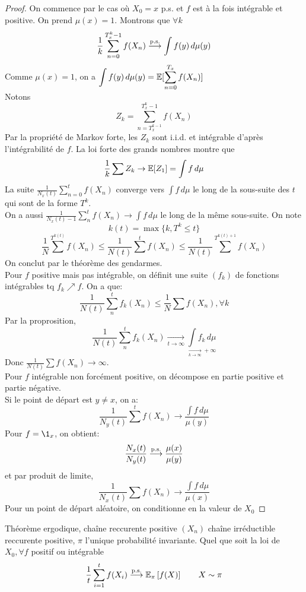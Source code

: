 \documentclass[]{report}
\begin{document}
    \begin{proof}
        On commence par le cas où $X_0=x$ p.s. et $f$ est à la fois intégrable et positive. On prend $\mu(x)=1$. Montrons que $\forall k$
        \[\frac{1}{k}\sum_{n=0}^{T_x^k-1}f(X_n)\overset{\text{p.s.}}{\longrightarrow}\int f(y)\, d\mu(y)\]
        Comme $\mu(x)=1$, on a $\displaystyle{\int f(y)\, d\mu(y)=\mathbb{E}[\sum^{T_x}_{n=0}f(X_n)]}$\\
        Notons \begin{displaymath}
            Z_k=\sum_{n=T_x^{k-1}}^{T_x^{k}-1}f(X_n)
        \end{displaymath}
        Par la propriété de Markov forte, les $Z_k$ sont i.i.d. et intégrable d'après l'intégrabilité de $f$. La loi forte des grands nombres montre que
        \[\frac{1}{k}\sum Z_k\to \mathbb{E}[Z_1]=\int f\, d\mu\]
        La suite $\frac{1}{N_x(t)}\sum_{n=0}^{t}f(X_n)$ converge vers $\int f\, d\mu$ le long de la sous-suite des $t$ qui sont de la forme $T^k$.\\
        On a aussi $\frac{1}{N_x(t)-1}\sum_{n}^{t}f(X_n)\to \int f\, d\mu$ le long de la même sous-suite. On note
        \[k(t)=\max\{k,T^k\le t\}\]
        \[\frac{1}{N}\sum^{T^{k(t)}}f(X_n)\le \frac{1}{N(t)}\sum^t f(X_n)\le \frac{1}{N(t)}\sum^{T^{k(t)+1}}f(X_n)\]
        On conclut par le théorème des gendarmes.\\
        Pour $f$ positive mais pas intégrable, on définit une suite $(f_k)$ de fonctions intégrables tq $f_k\nearrow f$. On a que:
        \[\frac{1}{N(t)}\sum_{n}^{t}f_k(X_n)\le \frac{1}{N}\sum f(X_n),\forall k\]
        Par la proprosition,
        \[\frac{1}{N(t)}\sum_{n}^{t}f_k(X_n)\underset{t\to \infty}{\longrightarrow}\underset{\underset{k\to \infty}{\longrightarrow}+\infty}{\int f_k \,d\mu}\]
        Donc $\frac{1}{N(t)}\sum f(X_n)\to \infty$.\\
        Pour $f$ intégrable non forcément positive, on décompose en partie positive et partie négative.\\
        Si le point de départ est $y\neq x$, on a:
        \[\frac{1}{N_y(t)}\sum^t f(X_n)\to \dfrac{\int f\, d\mu}{\mu(y)}\]
        Pour $f=\1_{x}$, on obtient:
        \[\dfrac{N_x(t)}{N_y(t)}\overset{\text{p.s.}}{\longrightarrow} \dfrac{\mu(x)}{\mu(y)}\]
        et par produit de limite,
        \[\dfrac{1}{N_x(t)}\sum f(X_n)\to \dfrac{\int f\, d\mu}{\mu(x)}\]
        Pour un point de départ aléatoire, on conditionne en la valeur de $X_0$
    \end{proof}

    \begin{cor}{Théorème ergodique, chaîne reccurente positive}{}
        $(X_n)$ chaîne irréductible reccurente positive, $\pi$ l'unique probabilité invariante. Quel que soit la loi de $X_0,\forall f$ positif ou intégrable
        \[\frac{1}{t}\sum_{i=1}^t f(X_i)\overset{\text{p.s.}}{\longrightarrow} \mathbb{E}_{\pi}\left[f(X)\right]\qquad X\sim \pi\]
    \end{cor}
\end{document}
